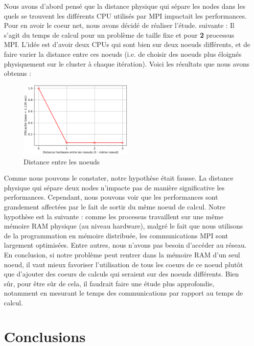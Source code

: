 \documentclass[10pt,twocolumn,letterpaper]{article}
\begin{document}
Nous avons d'abord pensé que la distance physique qui sépare les nodes dans
les quels se trouvent les différents CPU utilisés par MPI impactait les
performances. Pour en avoir le coeur net, nous avons décidé de réaliser l'étude.
suivante :
Il s'agit du temps de calcul pour un problème de taille fixe et pour \textbf{2}
processus MPI. L'idée est d'avoir deux CPUs qui sont bien sur deux noeuds
différents, et de faire varier la distance entre ces noeuds
(i.e. de choisir des noeuds plus éloignés physiquement sur le cluster à chaque
itération). Voici les résultats que nous avons obtenus :

\begin{figure}[H]
    \centering
    \caption{Distance entre les noeuds}
    \includegraphics[width=0.50\textwidth]{fig/dist_profiling.png}
  \end{figure}

Comme nous pouvons le constater, notre hypothèse était fausse. La distance
physique qui sépare deux nodes n'impacte pas de manière significative les
performances. Cependant, nous pouvons voir que les performances sont
grandement affectées par le fait de sortir du même noeud de calcul.
Notre hypothèse est la suivante : comme les processus travaillent sur une
même mémoire RAM physique (au niveau hardware), malgré le fait que nous
utilisons de la programmation en mémoire distribuée, les communications MPI
sont largement optimisées. Entre autres, nous n'avons pas besoin d'accéder
au réseau. En conclusion, si notre problème peut rentrer dans la mémoire RAM
d'un seul noeud, il vaut mieux favoriser l'utilisation de tous les coeurs de
ce noeud plutôt que d'ajouter des coeurs de calculs qui seraient sur des noeuds
différents. Bien sûr, pour être sûr de cela, il faudrait faire une étude plus
approfondie, notamment en mesurant le temps des communications par rapport au
temps de calcul.

\section*{Conclusions}
\end{document}
